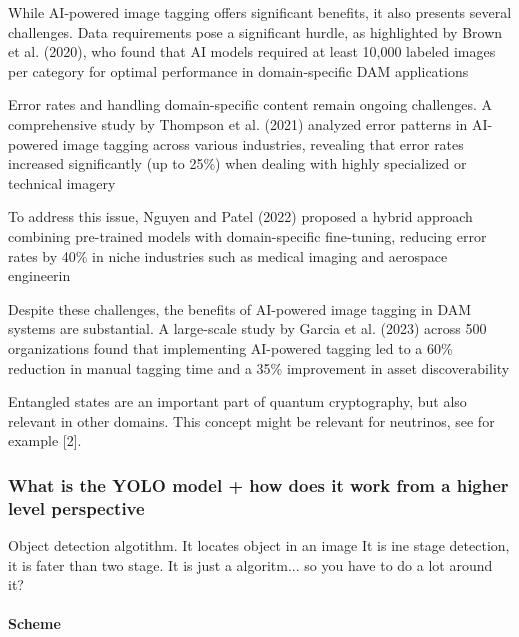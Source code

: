 \documentclass[a4paper,10pt,twocolumn]{article}
\numberwithin{figure}{section}
\numberwithin{table}{section}
\begin{document}
While AI-powered image tagging offers significant benefits, it also presents several challenges. Data requirements 
pose a significant hurdle, as highlighted by Brown et al. (2020), who found that AI models required at 
least 10,000 labeled images per category for optimal performance in domain-specific DAM applications

Error rates and handling domain-specific content remain ongoing challenges. A comprehensive study by 
Thompson et al. (2021) analyzed error patterns in AI-powered image tagging across various industries, 
revealing that error rates increased significantly (up to 25\%) when dealing with highly specialized or technical imagery

To address this issue, Nguyen and Patel (2022) proposed a hybrid approach combining pre-trained models with 
domain-specific fine-tuning, reducing error rates by 40\% in niche industries such as medical imaging and aerospace engineerin

Despite these challenges, the benefits of AI-powered image tagging in DAM systems are substantial. A large-scale study by Garcia et al. (2023)
 across 500 organizations found that implementing AI-powered tagging led to a 60\% reduction in manual tagging time and 
 a 35\% improvement in asset discoverability


Entangled states are an important part of quantum cryptography, but also relevant in other
domains. This concept might be relevant for neutrinos, see for example [2].

\subsubsection{What is the YOLO model + how does it work from a higher level perspective}
\vspace{0.3cm}

Object detection algotithm. It locates object in an image
It is ine stage detection, it is fater than two stage. 
It is just a algoritm... so you have to do a lot around it?

\paragraph{Scheme}

\end{document}
